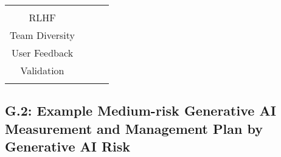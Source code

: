 \documentclass[fleqn]{article}
\begin{document}
\begin{landscape}
\begin{table}[H]
\begin{tabular}{|c|c|c|c|}
{			\textbullet\hspace{3pt} Restrict Homogeneity\\ 					
			\textbullet\hspace{3pt} RLHF\\ 
			\textbullet\hspace{3pt} Team Diversity\\ 	
			\textbullet\hspace{3pt} User Feedback\\ 	
			\textbullet\hspace{3pt} Validation\\ 					 	 
		}
		\\
		\hline
	\end{tabular}
	\label{table:med_risk_plan_by_tc_cont}
\end{table}

\vfill
\raisebox{-10pt}{\makebox[\linewidth]{\thepage}}

\pagebreak
\thispagestyle{empty}

\subsection*{G.2: Example Medium-risk Generative AI Measurement and Management Plan by Generative AI Risk}\label{appdxg2}


\end{landscape}
\end{document}
